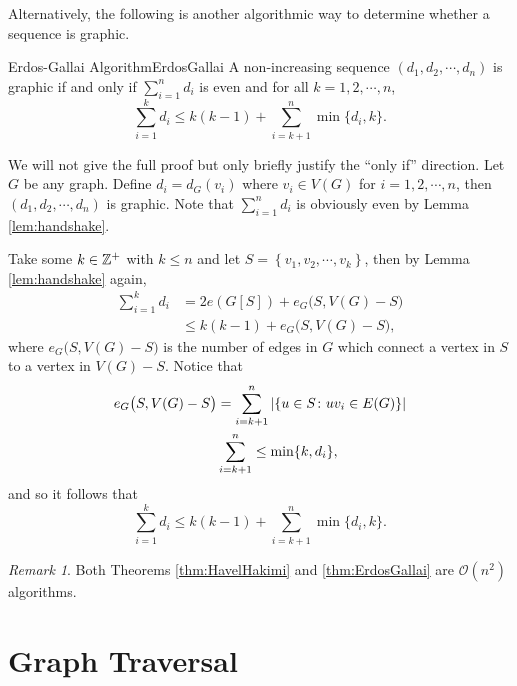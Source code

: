 \documentclass[math, code]{amznotes}
\theoremstyle{remark}
\newtheorem*{remark}{Remark}
\begin{document}
Alternatively, the following is another algorithmic way to determine whether a sequence is graphic.
\begin{thmbox}{Erdos-Gallai Algorithm}{ErdosGallai}
    A non-increasing sequence $(d_1, d_2, \cdots, d_n)$ is graphic if and only if $\sum_{i = 1}^n d_i$ is even and for all $k = 1, 2, \cdots, n$,
    \begin{equation*}
        \sum_{i = 1}^{k} d_i \leq k(k - 1) + \sum_{i = k + 1}^{n}\min\{d_i, k\}.
    \end{equation*}
\end{thmbox}
We will not give the full proof but only briefly justify the ``only if'' direction. Let $G$ be any graph. Define $d_i = d_G(v_i)$ where $v_i \in V(G)$ for $i = 1, 2, \cdots, n$, then $(d_1, d_2, \cdots, d_n)$ is graphic. Note that $\sum_{i = 1}^{n}d_i$ is obviously even by Lemma \ref{lem:handshake}. 

Take some $k \in \mathbb{Z}^+$ with $k \leq n$ and let $S = \left\{v_1, v_2, \cdots, v_k\right\}$, then by Lemma \ref{lem:handshake} again,
\begin{align*}
    \sum_{i = 1}^{k}d_i & = 2e(G[S]) + e_G\bigl(S, V(G) - S\bigr) \\
    & \leq k(k - 1) + e_G\bigl(S, V(G) - S\bigr),
\end{align*}
where $e_G\bigl(S, V(G) - S\bigr)$ is the number of edges in $G$ which connect a vertex in $S$ to a vertex in $V(G) - S$. Notice that
\begin{align*}
    e_G\bigl(S, V(G) - S\bigr) & = \sum_{i = k + 1}^n{\left\lvert {\left\{u \in S \colon uv_i \in E(G)\right\}} \right\rvert} \\
    & \sum_{i = k + 1}^n\leq \min\{k, d_i\},
\end{align*}
and so it follows that
\begin{equation*}
    \sum_{i = 1}^{k} d_i \leq k(k - 1) + \sum_{i = k + 1}^{n}\min\{d_i, k\}.
\end{equation*}
\begin{notebox}
    \begin{remark}
        Both Theorems \ref{thm:HavelHakimi} and \ref{thm:ErdosGallai} are $\mathcal{O}(n^2)$ algorithms.
    \end{remark}
\end{notebox}


\section{Graph Traversal}
\end{document}

